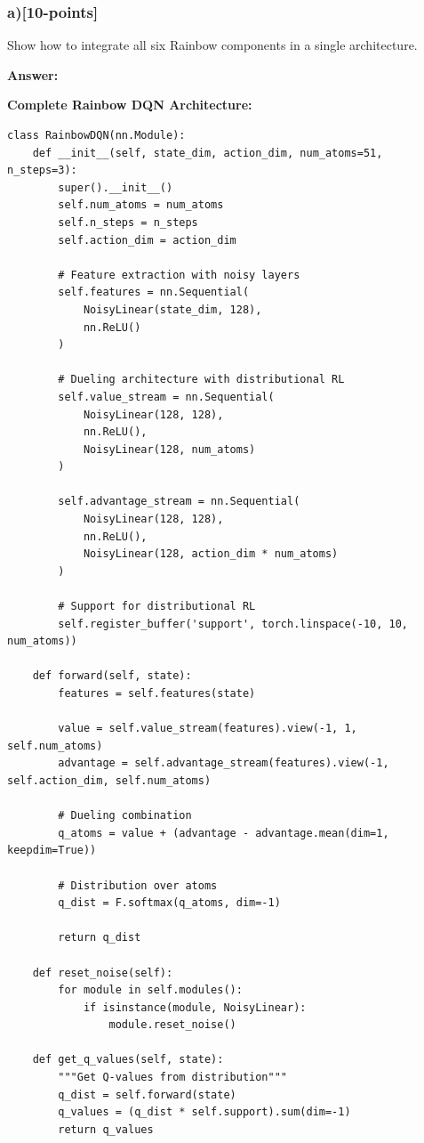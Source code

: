 \documentclass[12pt]{article}
\begin{document}
{{\subsubsection{a)[10-points]} Show how to integrate all six Rainbow components in a single architecture.

\textbf{Answer:}

\textbf{Complete Rainbow DQN Architecture:}

\begin{verbatim}
class RainbowDQN(nn.Module):
    def __init__(self, state_dim, action_dim, num_atoms=51, n_steps=3):
        super().__init__()
        self.num_atoms = num_atoms
        self.n_steps = n_steps
        self.action_dim = action_dim

        # Feature extraction with noisy layers
        self.features = nn.Sequential(
            NoisyLinear(state_dim, 128),
            nn.ReLU()
        )

        # Dueling architecture with distributional RL
        self.value_stream = nn.Sequential(
            NoisyLinear(128, 128),
            nn.ReLU(),
            NoisyLinear(128, num_atoms)
        )

        self.advantage_stream = nn.Sequential(
            NoisyLinear(128, 128),
            nn.ReLU(),
            NoisyLinear(128, action_dim * num_atoms)
        )

        # Support for distributional RL
        self.register_buffer('support', torch.linspace(-10, 10, num_atoms))

    def forward(self, state):
        features = self.features(state)

        value = self.value_stream(features).view(-1, 1, self.num_atoms)
        advantage = self.advantage_stream(features).view(-1, self.action_dim, self.num_atoms)

        # Dueling combination
        q_atoms = value + (advantage - advantage.mean(dim=1, keepdim=True))

        # Distribution over atoms
        q_dist = F.softmax(q_atoms, dim=-1)

        return q_dist

    def reset_noise(self):
        for module in self.modules():
            if isinstance(module, NoisyLinear):
                module.reset_noise()

    def get_q_values(self, state):
        """Get Q-values from distribution"""
        q_dist = self.forward(state)
        q_values = (q_dist * self.support).sum(dim=-1)
        return q_values
\end{verbatim}

}}
\end{document}

